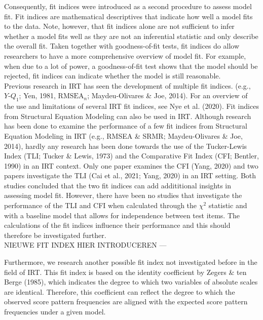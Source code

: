 \documentclass[Royal,sageapa,times,doublespace]{sagej}
\begin{document}
\indent Consequently, fit indices were introduced as a second procedure to assess model fit. Fit indices are mathematical descriptives that indicate how well a model fits to the data. Note, however, that fit indices alone are not sufficient to infer whether a model fits well as they are not an inferential statistic and only describe the overall fit. Taken together with goodness-of-fit tests, fit indices do allow researchers to have a more comprehensive overview of model fit. For example, when due to a lot of power, a goodness-of-fit test shows that the model should be rejected, fit indices can indicate whether the model is still reasonable. \\ 
\indent Previous research in IRT has seen the development of multiple fit indices. (e.g., $Y\text{-}Q_1$; Yen, 1981, $\text{RMSEA}_n$; Maydeu-Olivares \& Joe, 2014). For an overview of the use and limitations of several IRT fit indices, see Nye et al. (2020). Fit indices from Structural Equation Modeling can also be used in IRT. Although research has been done to examine the performance of a few fit indices from Structural Equation Modeling in IRT (e.g., RMSEA \& SRMR; Maydeu-Olivares \& Joe, 2014), hardly any research has been done towards the use of the Tucker-Lewis Index (TLI; Tucker \& Lewis, 1973) and the Comparative Fit Index (CFI; Bentler, 1990) in an IRT context. Only one paper examines the CFI (Yang, 2020) and two papers investigate the TLI (Cai et al., 2021; Yang, 2020) in an IRT setting. Both studies concluded that the two fit indices can add addititional insights in assessing model fit. However, there have been no studies that investigate the performance of the TLI and CFI when calculated through the $\chi^2$ statistic and with a baseline model that allows for independence between test items. The calculations of the fit indices influence their performance and this should therefore be investigated further. \\

NIEUWE FIT INDEX HIER INTRODUCEREN ---

\indent Furthermore, we research another possible fit index not investigated before in the field of IRT. This fit index is based on the identity coefficient by Zegers \& ten Berge (1985), which indicates the degree to which two variables of absolute scales are identical. Therefore, this coefficient can reflect the degree to which the observed score pattern frequencies are aligned with the expected score pattern frequencies under a given model. \\
\end{document}
